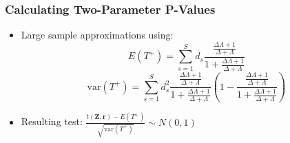 \documentclass{beamer}
\begin{document}
  \begin{frame}
    \frametitle{Calculating Two-Parameter P-Values}
    \begin{itemize}
    \item<+-> Large sample approximations using: 
$$E(T^+)=\sum_{s=1}^Sd_s\frac{ \frac{\Delta\Lambda+1}{\Delta+\Lambda} }{1+\frac{\Delta\Lambda+1}{\Delta+\Lambda} }$$
$$\textrm{var}(T^+)=\sum_{s=1}^Sd^2_s\frac{\frac{\Delta\Lambda+1}{\Delta+\Lambda} }{1+\frac{\Delta\Lambda+1}{\Delta+\Lambda} }(1-\frac{\frac{\Delta\Lambda+1}{\Delta+\Lambda} }{1+\frac{\Delta\Lambda+1}{\Delta+\Lambda} })$$
\item<+-> Resulting test:
  $\frac{t(\mathbf{Z,r})-E(T^+)}{\sqrt{\textrm{var}(T^+)}}\sim N(0,1)$
    \end{itemize}
  \end{frame}
\end{document}
